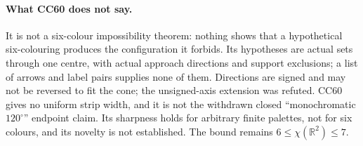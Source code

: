\documentclass[11pt]{article}
\theoremstyle{definition}
\theoremstyle{remark}
\begin{document}
\paragraph{What CC60 does not say.} It is not a six-colour impossibility
theorem: nothing shows that a hypothetical six-colouring produces the
configuration it forbids. Its hypotheses are actual sets through one
centre, with actual approach directions and support exclusions; a list of
arrows and label pairs supplies none of them. Directions are signed and may
not be reversed to fit the cone; the unsigned-axis extension was refuted.
CC60 gives no uniform strip width, and it is not the withdrawn closed
``monochromatic $120^\circ$'' endpoint claim. Its sharpness holds for
arbitrary finite palettes, not for six colours, and its novelty is not
established. The bound remains $6\le\chi(\mathbb R^2)\le7$.

\end{document}
